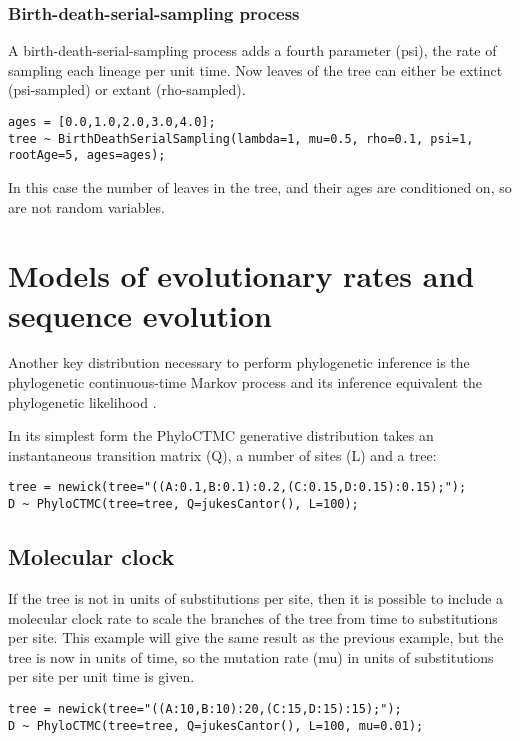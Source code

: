 \documentclass[oneside]{article}
\begin{document}
\subsubsection{Birth-death-serial-sampling process}

A birth-death-serial-sampling \cite{stadler2013dating} process adds a fourth parameter (psi), the rate of sampling each lineage per unit time. 
Now leaves of the tree can either be extinct (psi-sampled) or extant (rho-sampled). 

\begin{verbatim}
ages = [0.0,1.0,2.0,3.0,4.0];
tree ~ BirthDeathSerialSampling(lambda=1, mu=0.5, rho=0.1, psi=1, rootAge=5, ages=ages);
\end{verbatim}

In this case the number of leaves in the tree, and their ages are conditioned on, so are not random variables.

\section{Models of evolutionary rates and sequence evolution}

Another key distribution necessary to perform phylogenetic inference
is the phylogenetic continuous-time Markov process and its inference
equivalent the phylogenetic likelihood \cite{felsenstein1981}.

In its simplest form the PhyloCTMC generative
distribution takes an instantaneous transition matrix (Q), a number of sites (L) and a tree:

\begin{verbatim}
tree = newick(tree="((A:0.1,B:0.1):0.2,(C:0.15,D:0.15):0.15);");
D ~ PhyloCTMC(tree=tree, Q=jukesCantor(), L=100);
\end{verbatim}

\subsection{ Molecular clock}

If the tree is not in units of substitutions per site, then it is possible to include a molecular clock rate
to scale the branches of the tree from time to substitutions per site. This example will give the same
result as the previous example, but the tree is now in units of time, so the mutation rate (mu) in units of
substitutions per site per unit time is given.

\begin{verbatim}
tree = newick(tree="((A:10,B:10):20,(C:15,D:15):15);");
D ~ PhyloCTMC(tree=tree, Q=jukesCantor(), L=100, mu=0.01);
\end{verbatim}
\end{document}
